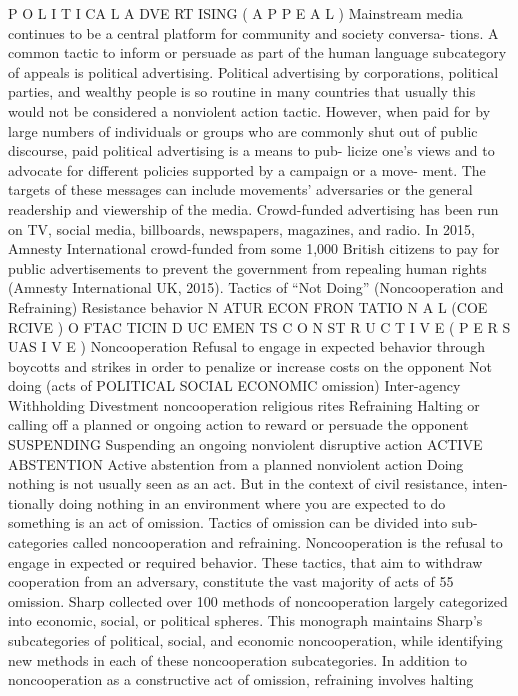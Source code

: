 \documentclass[twoside,a4paper,12pt,fleqn,openany]{extbook}
\begin{document}
P O L I T I CA L A DVE RT ISING ( A P P E A L )
Mainstream media continues to be a central platform for community and society conversa-
tions. A common tactic to inform or persuade as part of the human language subcategory of
appeals is political advertising. Political advertising by corporations, political parties, and
wealthy people is so routine in many countries that usually this would not be considered a
nonviolent action tactic. However, when paid for by large numbers of individuals or groups
who are commonly shut out of public discourse, paid political advertising is a means to pub-
licize one’s views and to advocate for different policies supported by a campaign or a move-
ment. The targets of these messages can include movements’ adversaries or the general
readership and viewership of the media. Crowd-funded advertising has been run on TV,
social media, billboards, newspapers, magazines, and radio. In 2015, Amnesty International
crowd-funded from some 1,000 British citizens to pay for public advertisements to prevent
the government from repealing human rights (Amnesty International UK, 2015).
Tactics of “Not Doing” (Noncooperation and Refraining)
Resistance
behavior
N ATUR ECON FRON TATIO N A L
(COE RCIVE )
O FTAC TICIN D UC EMEN TS
C O N ST R U C T I V E
( P E R S UAS I V E )
Noncooperation
Refusal to engage in expected behavior
through boycotts and strikes in order to penalize
or increase costs on the opponent
Not doing
(acts of
POLITICAL
 SOCIAL
 ECONOMIC
omission)
Inter-agency
 Withholding
 Divestment
noncooperation
 religious rites
Refraining
Halting or calling off a planned or ongoing action
to reward or persuade the opponent
SUSPENDING
Suspending an
ongoing nonviolent
disruptive action
ACTIVE ABSTENTION
Active abstention
from a planned
nonviolent action
Doing nothing is not usually seen as an act. But in the context of civil resistance, inten-
tionally doing nothing in an environment where you are expected to do something is an act
of omission. Tactics of omission can be divided into sub-categories called noncooperation
and refraining.
Noncooperation is the refusal to engage in expected or required behavior. These tactics,
that aim to withdraw cooperation from an adversary, constitute the vast majority of acts of
55
omission. Sharp collected over 100 methods of noncooperation largely categorized into
economic, social, or political spheres. This monograph maintains Sharp’s subcategories of
political, social, and economic noncooperation, while identifying new methods in each of
these noncooperation subcategories.
In addition to noncooperation as a constructive act of omission, refraining involves halting
\end{document}
